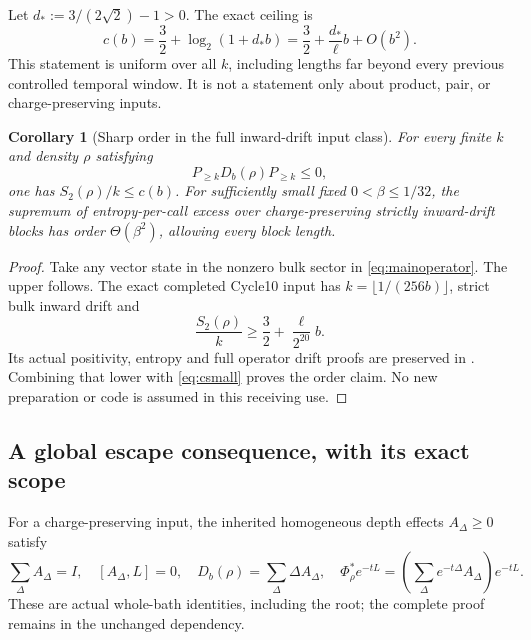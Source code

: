 \documentclass[11pt]{article}
\newtheorem{corollary}[theorem]{Corollary}
\begin{document}
Let \(d_*:=3/(2\sqrt2)-1>0\). The exact ceiling is
\begin{equation}\label{eq:csmall}
 c(b)=\frac32+\log_2(1+d_*b)
 =\frac32+\frac{d_*}{\ell}b+O(b^2).
\end{equation}
This statement is uniform over all \(k\), including lengths far beyond
every previous controlled temporal window. It is not a statement only
about product, pair, or charge-preserving inputs.

\begin{corollary}[Sharp order in the full inward-drift input class]
\label{cor:inward}
For every finite \(k\) and density \(\rho\) satisfying
\[
 P_{\ge k}D_b(\rho)P_{\ge k}\le0,
\]
one has \(S_2(\rho)/k\le c(b)\). For sufficiently small fixed
\(0<\beta\le1/32\), the supremum of entropy-per-call excess over
charge-preserving strictly inward-drift blocks has order
\(\Theta(\beta^2)\), allowing every block length.
\end{corollary}
\begin{proof}
Take any vector state in the nonzero bulk sector in
\eqref{eq:mainoperator}. The upper follows. The exact completed Cycle10
input has \(k=\lfloor1/(256b)\rfloor\), strict bulk inward drift and
\[
 \frac{S_2(\rho)}k\ge\frac32+\frac{\ell}{2^{20}}b.
\]
Its actual positivity, entropy and full operator drift proofs \cite{Cycle10} are
preserved in .
Combining that lower with \eqref{eq:csmall} proves the order claim.
No new preparation or code is assumed in this receiving use.
\end{proof}

\subsection{A global escape consequence, with its exact scope}

For a charge-preserving input, the inherited homogeneous depth effects
\(A_\Delta\ge0\) satisfy
\[
 \sum_\Delta A_\Delta=I,\quad[A_\Delta,L]=0,\quad
 D_b(\rho)=\sum_\Delta\Delta A_\Delta,\quad
 \Phi_\rho^*e^{-tL}
 =\left(\sum_\Delta e^{-t\Delta}A_\Delta\right)e^{-tL}.
\]
These are actual whole-bath identities, including the root; the complete
proof remains in the unchanged dependency.
\end{document}
